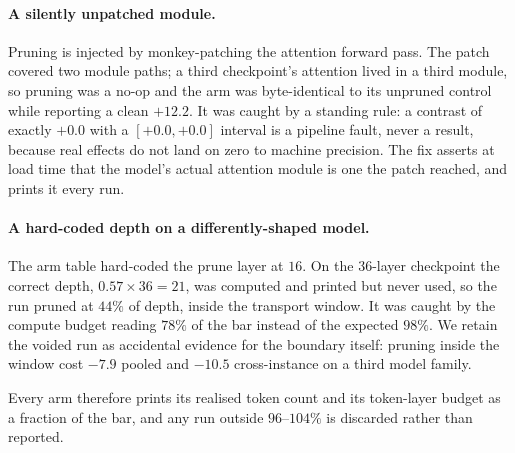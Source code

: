 \paragraph{A silently unpatched module.} Pruning is injected by monkey-patching the attention forward pass. The
patch covered two module paths; a third checkpoint's attention lived in a third module, so pruning was a no-op and
the arm was byte-identical to its unpruned control while reporting a clean $+12.2$. It was caught by a standing
rule: a contrast of exactly $+0.0$ with a $[+0.0,+0.0]$ interval is a pipeline fault, never a result, because real
effects do not land on zero to machine precision. The fix asserts at load time that the model's actual attention
module is one the patch reached, and prints it every run.

\paragraph{A hard-coded depth on a differently-shaped model.} The arm table hard-coded the prune layer at $16$. On
the $36$-layer checkpoint the correct depth, $0.57\times36=21$, was computed and printed but never used, so the run
pruned at $44\%$ of depth, inside the transport window. It was caught by the compute budget reading $78\%$ of the
bar instead of the expected $98\%$. We retain the voided run as accidental evidence for the boundary itself:
pruning inside the window cost $-7.9$ pooled and $-10.5$ cross-instance on a third model family.

Every arm therefore prints its realised token count and its token-layer budget as a fraction of the bar, and any
run outside $96$--$104\%$ is discarded rather than reported.

